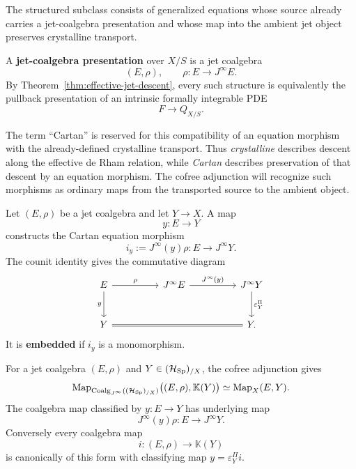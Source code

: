 The structured subclass consists of generalized equations whose source already
carries a jet-coalgebra presentation and whose map into the ambient jet object
preserves crystalline transport.

\begin{definition}
A \textbf{jet-coalgebra presentation} over \(X/S\) is a jet coalgebra
\[
  (E,\rho),
  \qquad
  \rho:E\longrightarrow J^\infty E.
\]
By Theorem~\ref{thm:effective-jet-descent}, every such structure is
equivalently the pullback presentation of an intrinsic formally integrable PDE
\[
  F\longrightarrow Q_{X/S}.
\]
\end{definition}

The term ``Cartan'' is reserved for this compatibility of an equation morphism
with the already-defined crystalline transport. Thus \emph{crystalline}
describes descent along the effective de Rham relation, while \emph{Cartan}
describes preservation of that descent by an equation morphism. The cofree
adjunction will recognize such morphisms as ordinary maps from the transported
source to the ambient object.

\begin{definition}
Let \((E,\rho)\) be a jet coalgebra and let \(Y\to X\). A
map
\[
  y:E\to Y
\]
constructs the Cartan equation morphism
\[
  i_y:=J^\infty(y)\rho:E\to J^\infty Y.
\]
The counit identity gives the commutative diagram
\[
\begin{tikzcd}[column sep=huge,row sep=large]
E \ar[r,"\rho"] \ar[d,"y"']
&
J^\infty E \ar[r,"J^\infty(y)"]
&
J^\infty Y \ar[d,"\varepsilon^\Pi_Y"]\\
Y \ar[rr,equal]
&& Y .
\end{tikzcd}
\]
It is \textbf{embedded} if \(i_y\) is a monomorphism.
\end{definition}

\begin{theorem}
\label{thm:cartan-recognition}
For a jet coalgebra \((E,\rho)\) and \(Y\in(\mathcal H_{\operatorname{Sp}})_{/X}\), the cofree
adjunction gives
\[
  \operatorname{Map}_{\operatorname{Coalg}_{J^\infty}((\mathcal H_{\operatorname{Sp}})_{/X})}
  \bigl((E,\rho),\mathbb K(Y)\bigr)
  \simeq
  \operatorname{Map}_X(E,Y).
\]
The coalgebra map classified by \(y:E\to Y\) has underlying map
\[
  J^\infty(y)\rho:E\to J^\infty Y.
\]
Conversely every coalgebra map
\[
  i:(E,\rho)\to\mathbb K(Y)
\]
is canonically of this form with classifying map \(y=\varepsilon^\Pi_Yi\).
\end{theorem}

